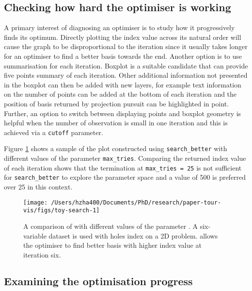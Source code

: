 \hypertarget{checking-how-hard-the-optimiser-is-working}{%
\subsection{Checking how hard the optimiser is
working}\label{checking-how-hard-the-optimiser-is-working}}

A primary interest of diagnosing an optimiser is to study how it
progressively finds its optimum. Directly plotting the index value
across its natural order will cause the graph to be disproportional to
the iteration since it usually takes longer for an optimiser to find a
better basis towards the end. Another option is to use summarisation for
each iteration. Boxplot is a suitable candidate that can provide five
points summary of each iteration. Other additional information not
presented in the boxplot can then be added with new layers, for example
text information on the number of points can be added at the bottom of
each iteration and the position of basis returned by projection pursuit
can be highlighted in point. Further, an option to switch between
displaying points and boxplot geometry is helpful when the number of
observation is small in one iteration and this is achieved via a
\texttt{cutoff} parameter.

Figure \ref{fig:toy-search} shows a sample of the plot constructed using
\texttt{search\_better} with different values of the parameter
\texttt{max\_tries}. Comparing the returned index value of each
iteration shows that the termination at \texttt{max\_tries\ =\ 25} is
not sufficient for \texttt{search\_better} to explore the parameter
space and a value of 500 is preferred over 25 in this context.

\begin{Schunk}
\begin{figure}

{\centering \texttt{[image: /Users/hzha400/Documents/PhD/research/paper-tour-vis/figs/toy-search-1]} 

}

\caption{A comparison of  with different values of the parameter . A six-variable dataset  is used with holes index on a 2D problem.  allows the optimiser to find better basis with higher index value at iteration six.}\label{fig:toy-search}
\end{figure}
\end{Schunk}

\hypertarget{toy-interp}{%
\subsection{Examining the optimisation progress}\label{toy-interp}}

